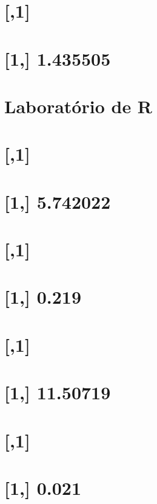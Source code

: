 \documentclass[]{book}
\theoremstyle{definition}
\theoremstyle{definition}
\theoremstyle{definition}
\theoremstyle{remark}
\begin{document}
\section{{[},1{]}}\label{section-63}

\section{{[}1,{]} 1.435505}\label{section-64}

\section{Laboratório de R}\label{laboratorio-de-r-4}

\section{{[},1{]}}\label{section-65}

\section{{[}1,{]} 5.742022}\label{section-66}

\section{{[},1{]}}\label{section-67}

\section{{[}1,{]} 0.219}\label{section-68}

\section{{[},1{]}}\label{section-69}

\section{{[}1,{]} 11.50719}\label{section-70}

\section{{[},1{]}}\label{section-71}

\section{{[}1,{]} 0.021}\label{section-72}
\end{document}
